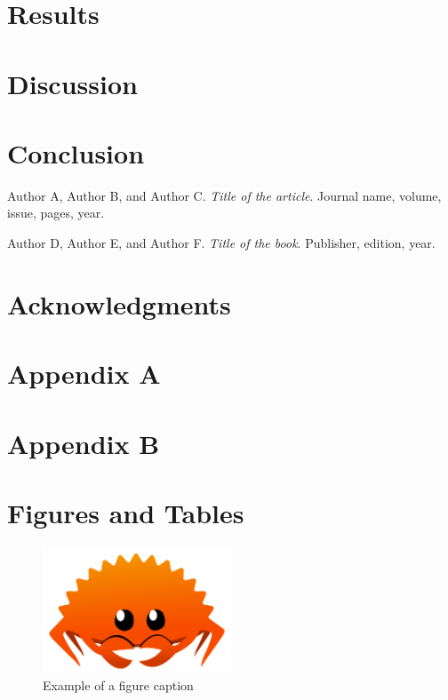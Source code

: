 \documentclass[12pt]{article}
\begin{document}
\section{Results}\label{sec:results}
\lipsum[6-7] %

\section{Discussion}\label{sec:discussion}
\lipsum[8-9] %

\section{Conclusion}\label{sec:conclusion}
\lipsum[10] %

\begin{thebibliography}{9}
Author A, Author B, and Author C. 
\textit{Title of the article}. 
Journal name, volume, issue, pages, year.

Author D, Author E, and Author F. 
\textit{Title of the book}. 
Publisher, edition, year.
\end{thebibliography}

\section*{Acknowledgments}
\lipsum[11] %

\appendix
\section{Appendix A}
\lipsum[12] %

\section{Appendix B}
\lipsum[13] %

\section*{Figures and Tables}
\begin{figure}[h]
\centering
\includegraphics[width=0.5\textwidth]{ferris_the_crab.png} %
\caption{Example of a figure caption}
\label{fig:example}
\end{figure}
\end{document}
